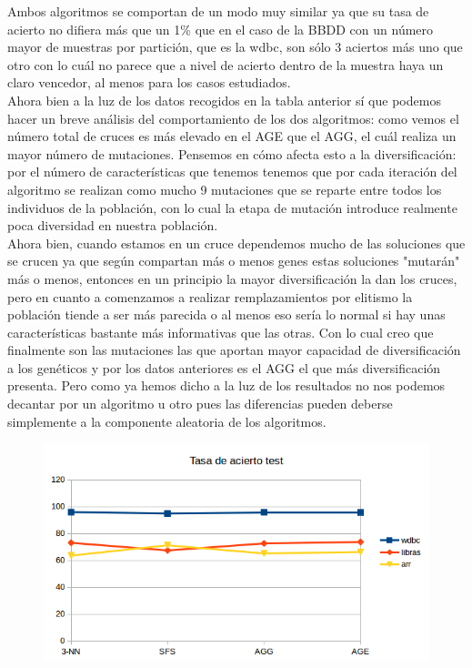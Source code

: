 \documentclass[10pt,a4paper]{article}
\begin{document}
Ambos algoritmos se comportan de un modo muy similar ya que su tasa de acierto no difiera más que un 1\% que en el caso de la BBDD con un número mayor de muestras por partición, que es la wdbc, son sólo 3 aciertos más uno que otro con lo cuál no parece que a nivel de acierto dentro de la muestra haya un claro vencedor, al menos para los casos estudiados.\\

Ahora bien a la luz de los datos recogidos en la tabla anterior sí que podemos hacer un breve análisis del comportamiento de los dos algoritmos: como vemos el número total de cruces es más elevado en el AGE que el AGG, el cuál realiza un mayor número de mutaciones. Pensemos en cómo afecta esto a la diversificación: por el número de características que tenemos tenemos que por cada iteración del algoritmo se realizan como mucho 9 mutaciones que se reparte entre todos los individuos de la población, con lo cual la etapa de mutación introduce realmente poca diversidad en nuestra población.\\

Ahora bien, cuando estamos en un cruce dependemos mucho de las soluciones que se crucen ya que según compartan más o menos genes estas soluciones "mutarán" más o menos, entonces en un principio la mayor diversificación la dan los cruces, pero en cuanto a comenzamos a realizar remplazamientos por elitismo la población tiende a ser más parecida o al menos eso sería lo normal si hay unas características bastante más informativas que las otras. Con lo cual creo que finalmente son las mutaciones las que aportan mayor capacidad de diversificación a los genéticos y por los datos anteriores es el AGG el que más diversificación presenta. Pero como ya hemos dicho a la luz de los resultados no nos podemos decantar por un algoritmo u otro pues las diferencias pueden deberse simplemente a la componente aleatoria de los algoritmos.\\

\begin{figure}[H]
\centering
\includegraphics[width=130mm]{tasa_test_ag.png}
\end{figure}
\end{document}
